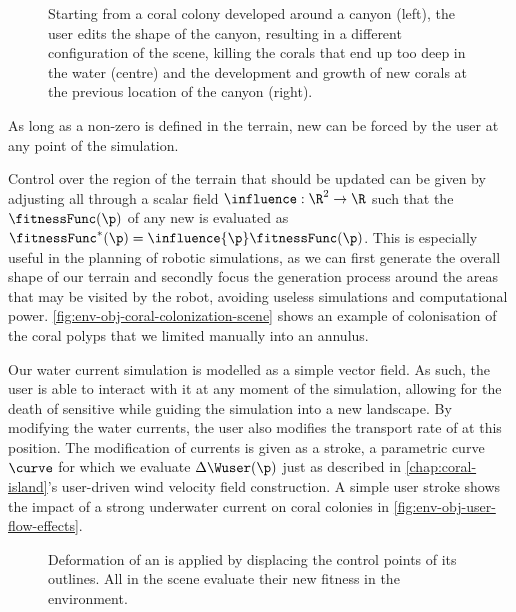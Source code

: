 \begin{figure}
    \caption{Starting from a coral colony developed around a canyon (left), the user edits the shape of the canyon, resulting in a different configuration of the scene, killing the corals that end up too deep in the water (centre) and the development and growth of new corals at the previous location of the canyon (right).}
    \label{fig:env-obj-user-interaction}
\end{figure}

As long as a non-zero  is defined in the terrain, new  can be forced by the user at any point of the simulation.

Control over the region of the terrain that should be updated can be given by adjusting all  through a scalar field $\influence: \R^2 \to \R $ such that the  $\fitnessFunc(\p)$ of any new  is evaluated as $\fitnessFunc^*(\p) = \influence{\p} \fitnessFunc(\p)$. This is especially useful in the planning of robotic simulations, as we can first generate the overall shape of our terrain and secondly focus the generation process around the areas that may be visited by the robot, avoiding useless simulations and computational power.
\cref{fig:env-obj-coral-colonization-scene} shows an example of colonisation of the coral polyps that we limited manually into an annulus.

Our water current simulation is modelled as a simple vector field. As such, the user is able to interact with it at any moment of the simulation, allowing for the death of sensitive  while guiding the simulation into a new landscape. By modifying the water currents, the user also modifies the transport rate of  at this position. The modification of currents is given as a stroke, a parametric curve $\curve$ for which we evaluate $\Delta \Wuser(\p)$ just as described in \cref{chap:coral-island}'s user-driven wind velocity field construction. A simple user stroke shows the impact of a strong underwater current on coral colonies in \cref{fig:env-obj-user-flow-effects}.

\begin{figure}
    \caption{Deformation of an  is applied by displacing the control points of its outlines. All  in the scene evaluate their new fitness in the environment.}
    \label{fig:env-obj-island-deformation}
\end{figure}

